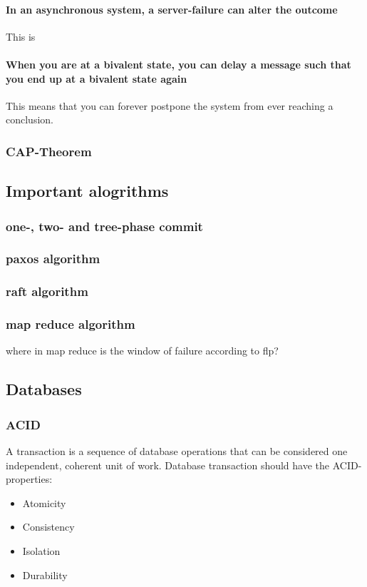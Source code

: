 \paragraph{In an asynchronous system, a server-failure can alter the outcome} This is
\paragraph{When you are at a bivalent state, you can delay a message such that you end up at a bivalent state again} This means that you can forever postpone the system from ever reaching a conclusion. 

\subsubsection{CAP-Theorem}

\subsection{Important alogrithms}
\subsubsection{one-, two- and tree-phase commit}
\subsubsection{paxos algorithm}
\subsubsection{raft algorithm}
\subsubsection{map reduce algorithm}
where in map reduce is the window of failure according to flp?


\subsection{Databases}

\subsubsection{ACID}
A transaction is a sequence of database operations that can be considered one independent, coherent unit of work. Database transaction should have the ACID-properties:
\begin{itemize}
    \item Atomicity
    \item Consistency
    \item Isolation
    \item Durability
\end{itemize}

